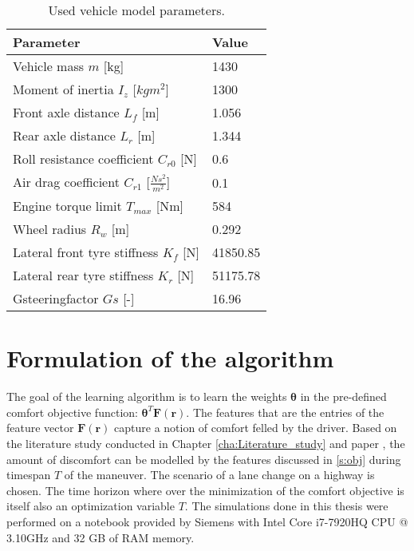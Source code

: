 \begin{table}[h]
	\centering
	\begin{tabular}{|p{5cm}|p{2cm}|}
		\hline
		\textbf{Parameter} & \textbf{Value}\\ \hline		
		Vehicle mass $m$ [kg] & 1430\\ \hline
		Moment of inertia $I_z$ [$kgm^2$] & 1300\\ \hline
		Front axle distance $L_f$ [m] & 1.056\\ \hline
		Rear axle distance $L_r$ [m] & 1.344\\ \hline
		Roll resistance coefficient $C_{r0}$ [N] & 0.6\\ \hline
		Air drag coefficient $C_{r1}$ [$\frac{Ns^2}{m^2}$] & 0.1\\ \hline
		Engine torque limit $T_{max}$ [Nm] & 584\\ \hline
		Wheel radius $R_w$ [m] & 0.292\\ \hline
		Lateral front tyre stiffness $K_{f}$ [N] & 41850.85\\ \hline
		Lateral rear tyre stiffness $K_{r}$ [N] & 51175.78\\ \hline
		Gsteeringfactor $Gs$ [-] &16.96 \\ \hline
		
	\end{tabular}
	\caption{Used vehicle model parameters.}
	\label{table:vehicel_model_param}
\end{table}
\newpage
\section{Formulation of the algorithm} \label{s:learning_alg}
The goal of the learning algorithm is to learn the weights $\bm{\theta}$ in the pre-defined comfort objective function: $\bm{\theta}^T\bm{F}(\bm{r})$. The features that are the entries of the feature vector $\bm{F}(\bm{r})$ capture a notion of comfort felled by the driver. Based on the literature study conducted in Chapter \ref{cha:Literature_study} and paper \cite{Kuderer2015a}, the amount of discomfort can be modelled by the features discussed in \ref{s:obj} during timespan $T$ of the maneuver. The scenario of a lane change on a highway is chosen. The time horizon where over the minimization of the comfort objective is itself also an optimization variable  $T$. The simulations done in this thesis were performed on a notebook provided by Siemens with Intel Core i7-7920HQ CPU @ 3.10GHz and 32 GB of RAM memory.\\


